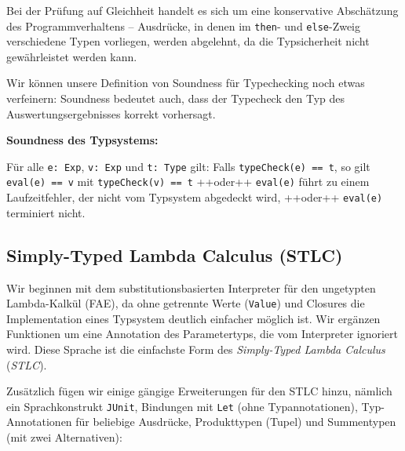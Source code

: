 \documentclass[]{article}
\begin{document}
Bei der Prüfung auf Gleichheit handelt es sich um eine konservative
Abschätzung des Programmverhaltens -- Ausdrücke, in denen im
\texttt{then}- und \texttt{else}-Zweig verschiedene Typen vorliegen,
werden abgelehnt, da die Typsicherheit nicht gewährleistet werden kann.

Wir können unsere Definition von Soundness für Typechecking noch etwas
verfeinern: Soundness bedeutet auch, dass der Typecheck den Typ des
Auswertungsergebnisses korrekt vorhersagt.

\textbf{Soundness des Typsystems:}

Für alle \texttt{e:\ Exp}, \texttt{v:\ Exp} und \texttt{t:\ Type} gilt:
Falls \texttt{typeCheck(e)\ ==\ t}, so gilt \texttt{eval(e)\ ==\ v} mit
\texttt{typeCheck(v)\ ==\ t} ++oder++ \texttt{eval(e)} führt zu einem
Laufzeitfehler, der nicht vom Typsystem abgedeckt wird, ++oder++
\texttt{eval(e)} terminiert nicht.

\hypertarget{simply-typed-lambda-calculus-stlc}{%
\subsection{Simply-Typed Lambda Calculus
(STLC)}\label{simply-typed-lambda-calculus-stlc}}

Wir beginnen mit dem substitutionsbasierten Interpreter für den
ungetypten Lambda-Kalkül (FAE), da ohne getrennte Werte (\texttt{Value})
und Closures die Implementation eines Typsystem deutlich einfacher
möglich ist. Wir ergänzen Funktionen um eine Annotation des
Parametertyps, die vom Interpreter ignoriert wird. Diese Sprache ist die
einfachste Form des \emph{Simply-Typed Lambda Calculus} (\emph{STLC}).

Zusätzlich fügen wir einige gängige Erweiterungen für den STLC hinzu,
nämlich ein Sprachkonstrukt \texttt{JUnit}, Bindungen mit \texttt{Let}
(ohne Typannotationen), Typ-Annotationen für beliebige Ausdrücke,
Produkttypen (Tupel) und Summentypen (mit zwei Alternativen):
\end{document}
